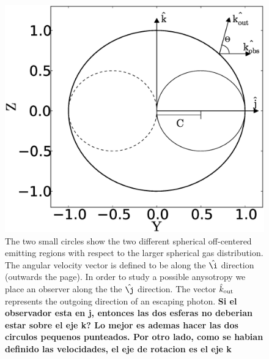 \documentclass{emulateapj}
\newcommand{\ly}{{\ifmmode{{\rm Ly}\alpha~}\else{Ly$\alpha$~}\fi}}
\begin{document}
\label{sec:off-center}
\begin{figure}
  \includegraphics[scale=0.3]{f8.eps}
  \caption{The two small circles show the two different spherical
    off-centered emitting regions with respect to the larger spherical
    gas distribution. The angular velocity vector is
    defined to be along the $\hat{\i}$ direction (outwards the
    page). In order to study a possible anysotropy we place an
    observer along the the $\hat{\j}$ direction. The vector
    $\hat{k}_{\rm out}$ represents the outgoing direction of an
    escaping \ly photon. {\bf Si el observador esta en j, entonces las
    dos esferas no deberian estar sobre el eje k? Lo mejor es ademas
    hacer las dos circulos pequenos punteados. Por otro lado, como se
    habian definido las velocidades, el eje de rotacion es el eje k}
    \label{fig:OCspheres}} 
\end{figure}
\end{document}
